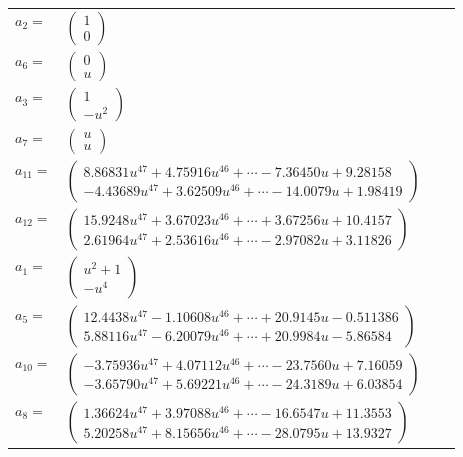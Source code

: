 \documentclass[1p]{elsarticle_modified}
\theoremstyle{definition}
\begin{document}
\begin{tabular}{m{7pt} m{180pt} m{7pt} m{180pt} }
\flushright $a_{2}=$&$\begin{pmatrix}1\\0\end{pmatrix}$ \\
\flushright $a_{6}=$&$\begin{pmatrix}0\\u\end{pmatrix}$ \\
\flushright $a_{3}=$&$\begin{pmatrix}1\\- u^2\end{pmatrix}$ \\
\flushright $a_{7}=$&$\begin{pmatrix}u\\u\end{pmatrix}$ \\
\flushright $a_{11}=$&$\begin{pmatrix}8.86831 u^{47}+4.75916 u^{46}+\cdots-7.36450 u+9.28158\\-4.43689 u^{47}+3.62509 u^{46}+\cdots-14.0079 u+1.98419\end{pmatrix}$ \\
\flushright $a_{12}=$&$\begin{pmatrix}15.9248 u^{47}+3.67023 u^{46}+\cdots+3.67256 u+10.4157\\2.61964 u^{47}+2.53616 u^{46}+\cdots-2.97082 u+3.11826\end{pmatrix}$ \\
\flushright $a_{1}=$&$\begin{pmatrix}u^2+1\\- u^4\end{pmatrix}$ \\
\flushright $a_{5}=$&$\begin{pmatrix}12.4438 u^{47}-1.10608 u^{46}+\cdots+20.9145 u-0.511386\\5.88116 u^{47}-6.20079 u^{46}+\cdots+20.9984 u-5.86584\end{pmatrix}$ \\
\flushright $a_{10}=$&$\begin{pmatrix}-3.75936 u^{47}+4.07112 u^{46}+\cdots-23.7560 u+7.16059\\-3.65790 u^{47}+5.69221 u^{46}+\cdots-24.3189 u+6.03854\end{pmatrix}$ \\
\flushright $a_{8}=$&$\begin{pmatrix}1.36624 u^{47}+3.97088 u^{46}+\cdots-16.6547 u+11.3553\\5.20258 u^{47}+8.15656 u^{46}+\cdots-28.0795 u+13.9327\end{pmatrix}$ \\

\end{tabular}
\end{document}
